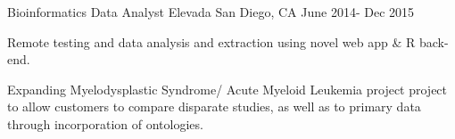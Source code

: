 \begin{cventries}
  \cventry
    {Bioinformatics Data Analyst}
    {Elevada}
    {San Diego, CA}
    {June 2014- Dec 2015}
    {
      \begin{cvitems}
        \item {Remote testing and data analysis and extraction using novel web app \& R back-end. }
       \item {Expanding Myelodysplastic Syndrome/ Acute Myeloid Leukemia project project to allow customers to compare disparate studies, as well as to primary data through incorporation of ontologies.}
      \end{cvitems}
    }

\end{cventries}
